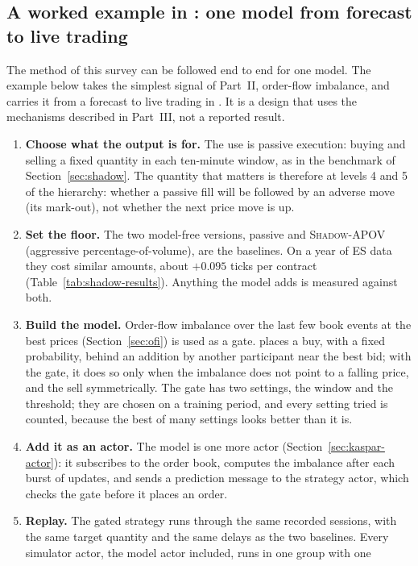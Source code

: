 \subsection{A worked example in \kasparhft{}: one model from forecast to live trading}
\label{sec:worked-kaspar}

The method of this survey can be followed end to end for one model. The example below takes the simplest signal of
Part~II, order-flow imbalance, and carries it from a forecast to live trading in \kasparhft{}. It is a design that uses the
mechanisms described in Part~III, not a reported result.
\begin{enumerate}[leftmargin=1.8em,itemsep=3pt]
\item \textbf{Choose what the output is for.} The use is passive execution: buying and selling a fixed quantity in
  each ten-minute window, as in the benchmark of Section~\ref{sec:shadow}. The quantity that matters is therefore at
  levels 4 and 5 of the hierarchy: whether a passive fill will be followed by an adverse move (its mark-out), not
  whether the next price move is up.
\item \textbf{Set the floor.} The two model-free versions, passive \pov{} and \textsc{Shadow-APOV} (aggressive
  percentage-of-volume), are the baselines. On a year of ES data they cost similar amounts, about $+0.095$ ticks per
  contract (Table~\ref{tab:shadow-results}).
  Anything the model adds is measured against both.
\item \textbf{Build the model.} Order-flow imbalance over the last few book events at the best prices
  (Section~\ref{sec:ofi}) is used as a gate. \pov{} places a buy, with a fixed probability, behind an addition by another participant near
  the best bid; with the gate, it does so only when the imbalance does not point to a falling price, and the sell
  symmetrically. The gate has two settings, the window and
  the threshold; they are chosen on a training period, and every setting tried is counted, because the best of many
  settings looks better than it is.
\item \textbf{Add it as an actor.} The model is one more actor (Section~\ref{sec:kaspar-actor}): it subscribes to the
  order book, computes the imbalance after each burst of updates, and sends a prediction message to the strategy
  actor, which checks the gate before it places an order.
\item \textbf{Replay.} The gated strategy runs through the same recorded sessions, with the same target quantity and
  the same delays as the two baselines. Every simulator actor, the model actor included, runs in one group with one

\end{enumerate}
